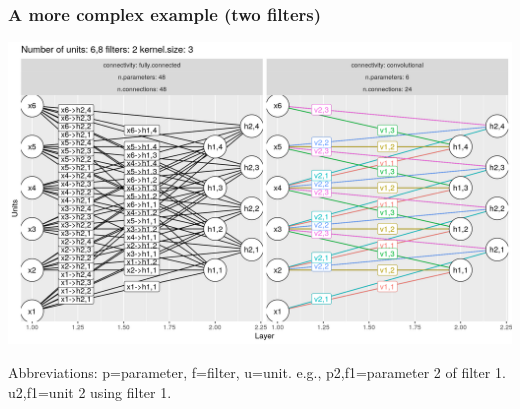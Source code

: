 \documentclass{beamer}
\begin{document}
\begin{frame}
  \frametitle{A more complex example (two filters)}
  \includegraphics[width=\textwidth]{figure-convolutional-filters-6-3-2}
   
  Abbreviations: p=parameter, f=filter, u=unit.
  e.g., p2,f1=parameter 2 of filter 1. u2,f1=unit 2 using filter 1.
\end{frame}
\end{document}

